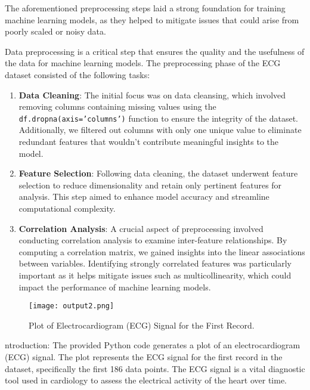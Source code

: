 \documentclass{report}
\begin{document}
The aforementioned preprocessing steps laid a strong foundation for training machine learning models, as they helped to mitigate issues that could arise from poorly scaled or noisy data.

Data preprocessing is a critical step that ensures the quality and the usefulness of the data for machine learning models. The preprocessing phase of the ECG dataset consisted of the following tasks:

\begin{enumerate}
    \item \textbf{Data Cleaning}: The initial focus was on data cleansing, which involved removing columns containing missing values using the 
    \texttt{df.dropna(axis='columns')} function to ensure the integrity of the dataset. Additionally, we filtered out columns with only one unique value to eliminate redundant features that wouldn't contribute meaningful insights to the model.
    
    \item \textbf{Feature Selection}: Following data cleaning, the dataset underwent feature selection to reduce dimensionality and retain only pertinent features for analysis. This step aimed to enhance model accuracy and streamline computational complexity.
    
    \item \textbf{Correlation Analysis}:  A crucial aspect of preprocessing involved conducting correlation analysis to examine inter-feature relationships. By computing a correlation matrix, we gained insights into the linear associations between variables. Identifying strongly correlated features was particularly important as it helps mitigate issues such as multicollinearity, which could impact the performance of machine learning models.
\end{enumerate}
    
\begin{figure}[ht]
    \centering
    \texttt{[image: output2.png]} 
    \caption{Plot of Electrocardiogram (ECG) Signal for the First Record.}
    \label{fig:correlation_matrix}
\end{figure}

ntroduction:
The provided Python code generates a plot of an electrocardiogram (ECG) signal. The plot represents the ECG signal for the first record in the dataset, specifically the first 186 data points. The ECG signal is a vital diagnostic tool used in cardiology to assess the electrical activity of the heart over time.
\end{document}
